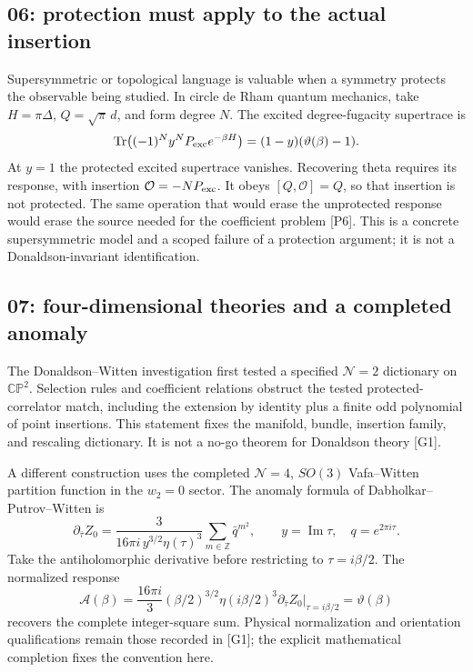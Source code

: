 \documentclass[11pt,letterpaper]{article}
\numberwithin{equation}{section}
\theoremstyle{remark}
\DeclareMathOperator{\Tr}{Tr}
\newcommand{\evid}[1]{\textsf{[#1]}}
\begin{document}
\subsection{06: protection must apply to the actual insertion}

Supersymmetric or topological language is valuable when a symmetry
protects the observable being studied. In circle de Rham quantum
mechanics, take $H=\pi\Delta$, $Q=\sqrt\pi\,d$, and form degree $N$.
The excited degree-fugacity supertrace is
\begin{equation}
 \Tr\bigl((-1)^N y^N P_{\rm exc}e^{-\beta H}\bigr)
        =(1-y)(\vartheta(\beta)-1).
\end{equation}
At $y=1$ the protected excited supertrace vanishes. Recovering theta
requires its response, with insertion $\mathcal O=-NP_{\rm exc}$.
It obeys $[Q,\mathcal O]=Q$, so that insertion is not protected.
The same operation that would erase the unprotected response would
erase the source needed for the coefficient problem \evid{P6}.
This is a concrete supersymmetric model and a scoped failure of a
protection argument; it is not a Donaldson-invariant identification.

\subsection{07: four-dimensional theories and a completed anomaly}

The Donaldson--Witten investigation first tested a specified
$\mathcal N=2$ dictionary on $\mathbb{CP}^2$. Selection rules and
coefficient relations obstruct the tested protected-correlator match,
including the extension by identity plus a finite odd polynomial of
point insertions. This statement fixes the manifold, bundle, insertion
family, and rescaling dictionary. It is not a no-go theorem for
Donaldson theory \evid{G1}.

A different construction uses the completed $\mathcal N=4$,
$SO(3)$ Vafa--Witten partition function in the $w_2=0$ sector.
The anomaly formula of Dabholkar--Putrov--Witten
\cite[eq.~(2)]{DabholkarPutrovWitten2020} is
\begin{equation}
 \partial_{\bar\tau}Z_0
 =\frac{3}{16\pi i\,y^{3/2}\eta(\tau)^3}
                 \sum_{m\in\mathbb Z}\bar q^{m^2},
 \qquad y=\operatorname{Im}\tau,\quad q=e^{2\pi i\tau}.
\end{equation}
Take the antiholomorphic derivative before restricting to
$\tau=i\beta/2$. The normalized response
\begin{equation}
 \mathcal A(\beta)=\frac{16\pi i}{3}(\beta/2)^{3/2}
 \eta(i\beta/2)^3
 \left.\partial_{\bar\tau}Z_0\right|_{\tau=i\beta/2}
 =\vartheta(\beta) \label{eq:anomaly}
\end{equation}
recovers the complete integer-square sum. Physical normalization and
orientation qualifications remain those recorded in \evid{G1}; the
explicit mathematical completion fixes the convention here.
\end{document}
